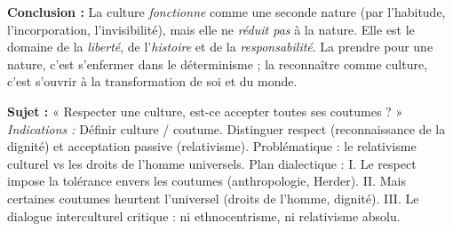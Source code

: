 \documentclass[11pt]{article}
\begin{document}
\begin{exoresolu}
\textbf{Conclusion :} La culture \emph{fonctionne} comme une seconde nature (par l'habitude, l'incorporation, l'invisibilité), mais elle ne \emph{réduit pas} à la nature. Elle est le domaine de la \emph{liberté}, de l'\emph{histoire} et de la \emph{responsabilité}. La prendre pour une nature, c'est s'enfermer dans le déterminisme ; la reconnaître comme culture, c'est s'ouvrir à la transformation de soi et du monde.
\end{exoresolu}

\begin{exercice}
\textbf{Sujet :} « Respecter une culture, est-ce accepter toutes ses coutumes ? » \\
\textit{Indications :} Définir culture / coutume. Distinguer respect (reconnaissance de la dignité) et acceptation passive (relativisme). Problématique : le relativisme culturel vs les droits de l'homme universels. Plan dialectique : I. Le respect impose la tolérance envers les coutumes (anthropologie, Herder). II. Mais certaines coutumes heurtent l'universel (droits de l'homme, dignité). III. Le dialogue interculturel critique : ni ethnocentrisme, ni relativisme absolu.
\end{exercice}
\end{document}
